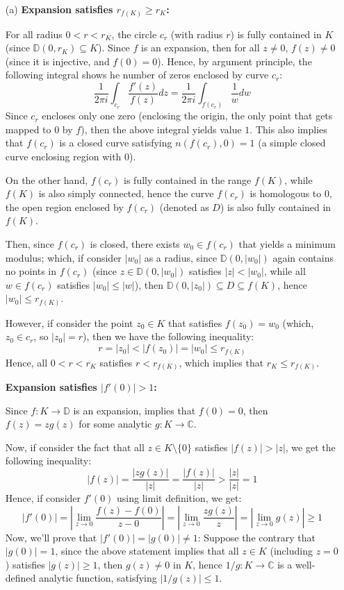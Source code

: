 \documentclass{article}
\begin{document}
\begin{itemize}
    \item[(a)] \textbf{Expansion satisfies $r_{f(K)}\geq r_K$:}
    
    For all radius $0<r<r_K$, the circle $c_r$ (with radius $r$) is fully contained in $K$ (since $\mathbb{D}(0,r_K)\subseteq K$).
    Since $f$ is an expansion, then for all $z\neq 0$, $f(z)\neq 0$ (since it is injective, and $f(0)=0$). Hence, by argument principle,
    the following integral shows he number of zeros enclosed by curve $c_r$:
    $$\frac{1}{2\pi i}\int_{c_r}\frac{f'(z)}{f(z)}dz = \frac{1}{2\pi i}\int_{f(c_r)}\frac{1}{w}dw$$
    Since $c_r$ encloses only one zero (enclosing the origin, the only point that gets mapped to $0$ by $f$), then the above integral yields value $1$.
    This also implies that $f(c_r)$ is a closed curve satisfying $n(f(c_r),0)=1$ (a simple closed curve enclosing region with $0$).

    On the other hand, $f(c_r)$ is fully contained in the range $f(K)$, while $f(K)$ is also simply connected, hence the curve $f(c_r)$ is homologous to $0$,
    the open region enclosed by $f(c_r)$ (denoted as $D$) is also fully contained in $f(K)$.

    Then, since $f(c_r)$ is closed, there exists $w_0\in f(c_r)$ that yields a minimum modulus; which, if consider $|w_0|$ as a radius, since $\mathbb{D}(0,|w_0|)$ again contains no points in $f(c_r)$ (since $z\in \mathbb{D}(0,|w_0|)$ satisfies $|z|<|w_0|$, while all $w\in f(c_r)$ satisfies $|w_0|\leq |w|$),
    then $\mathbb{D}(0,|z_0|)\subseteq D \subseteq f(K)$, hence $|w_0|\leq r_{f(K)}$.

    However, if consider the point $z_0\in K$ that satisfies $f(z_0)=w_0$ (which, $z_0\in c_r$, so $|z_0|=r$), then we have the following inequality:
    $$r=|z_0|<|f(z_0)|=|w_0|\leq r_{f(K)}$$
    Hence, all $0<r<r_K$ satisfies $r<r_{f(K)}$, which implies that $r_K\leq r_{f(K)}$.

    \textbf{Expansion satisfies $|f'(0)|>1$:}

    Since $f:K\rightarrow\mathbb{D}$ is an expansion, implies that $f(0)=0$, then $f(z)=zg(z)$ for some analytic $g:K\rightarrow\mathbb{C}$.

    Now, if consider the fact that all $z\in K\setminus\{0\}$ satisfies $|f(z)|>|z|$, we get the following inequality:
    $$|f(z)|=\frac{|zg(z)|}{|z|}=\frac{|f(z)|}{|z|} > \frac{|z|}{|z|}=1$$
    Hence, if consider $f'(0)$ using limit definition, we get:
    $$|f'(0)|=\left|\lim_{z\rightarrow 0}\frac{f(z)-f(0)}{z-0}\right|=\left|\lim_{z\rightarrow 0}\frac{zg(z)}{z}\right|=|\lim_{z\rightarrow 0}g(z)| \geq 1$$
    Now, we'll prove that $|f'(0)|=|g(0)|\neq 1$: Suppose the contrary that $|g(0)|=1$, since the above statement implies that all $z\in K$ (including $z=0$) satisfies $|g(z)|\geq 1$, then $g(z)\neq 0$ in $K$, hence $1/g:K\rightarrow\mathbb{C}$ is a well-defined analytic function, satisfying $|1/g(z)|\leq 1$.


\end{itemize}
\end{document}
